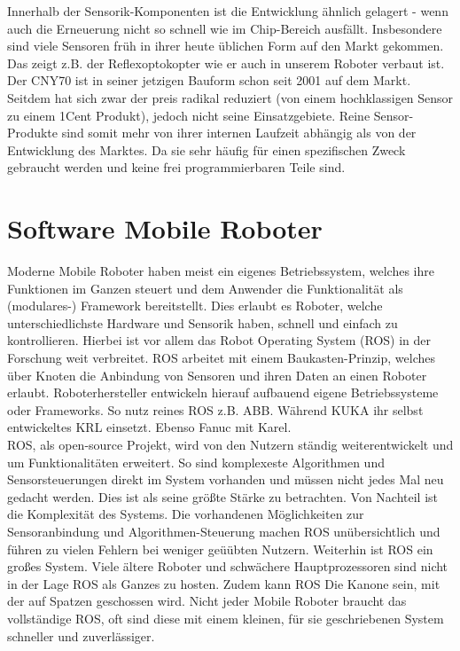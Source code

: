 \documentclass[twoside,12pt,a4paper]{report}
\begin{document}
	Innerhalb der Sensorik-Komponenten ist die Entwicklung ähnlich gelagert - wenn auch die Erneuerung nicht so schnell wie im Chip-Bereich ausfällt. Insbesondere sind viele Sensoren früh in ihrer heute üblichen Form auf den Markt gekommen. Das zeigt z.B. der Reflexoptokopter wie er auch in unserem Roboter verbaut ist. Der CNY70 ist in seiner jetzigen Bauform schon seit 2001 auf dem Markt. Seitdem hat sich zwar der preis radikal reduziert (von einem hochklassigen Sensor zu einem 1Cent Produkt), jedoch nicht seine Einsatzgebiete. Reine Sensor-Produkte sind somit mehr von ihrer internen Laufzeit abhängig als von der Entwicklung des Marktes. Da sie sehr häufig für einen spezifischen Zweck gebraucht werden und keine frei programmierbaren Teile sind. 
	
	
	\section{Software Mobile Roboter}
	Moderne Mobile Roboter haben meist ein eigenes Betriebssystem, welches ihre Funktionen im Ganzen steuert und dem Anwender die Funktionalität als (modulares-) Framework bereitstellt. Dies erlaubt es Roboter, welche unterschiedlichste Hardware und Sensorik haben, schnell und einfach zu kontrollieren. Hierbei ist vor allem das Robot Operating System (ROS) in der Forschung weit verbreitet. ROS arbeitet mit einem Baukasten-Prinzip, welches über Knoten die Anbindung von Sensoren und ihren Daten an einen Roboter erlaubt. Roboterhersteller entwickeln hierauf aufbauend eigene Betriebssysteme oder Frameworks. So nutz reines ROS z.B. ABB. Während KUKA ihr selbst entwickeltes KRL einsetzt. Ebenso Fanuc mit Karel. \\
	ROS, als open-source Projekt, wird von den Nutzern ständig weiterentwickelt und um Funktionalitäten erweitert. So sind komplexeste Algorithmen und Sensorsteuerungen direkt im System vorhanden und müssen nicht jedes Mal neu gedacht werden. Dies ist als seine größte Stärke zu betrachten. Von Nachteil ist die Komplexität des Systems. Die vorhandenen Möglichkeiten zur Sensoranbindung und Algorithmen-Steuerung machen ROS unübersichtlich und führen zu vielen Fehlern bei weniger geüübten Nutzern. Weiterhin ist ROS ein großes System. Viele ältere Roboter und schwächere Hauptprozessoren sind nicht in der Lage ROS als Ganzes zu hosten. Zudem kann ROS Die Kanone sein, mit der auf Spatzen geschossen wird. Nicht jeder Mobile Roboter braucht das vollständige ROS, oft sind diese mit einem kleinen, für sie geschriebenen System schneller und zuverlässiger. \\
\end{document}

